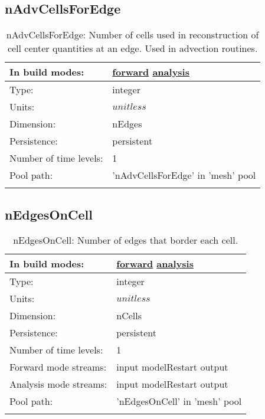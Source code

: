 \subsection[nAdvCellsForEdge]{nAdvCellsForEdge}
\label{subsec:var_sec_mesh_nAdvCellsForEdge}
\begin{center}
\begin{longtable}{| p{2.0in} | p{4.0in} |}
        \hline 
        In build modes: & \hyperref[subsec:forward_var_tab_mesh]{forward} \hyperref[subsec:analysis_var_tab_mesh]{analysis} \\
        \hline 
        Type: & integer \\
        \hline 
        Units: & $unitless$ \\
        \hline 
        Dimension: & nEdges \\
        \hline 
        Persistence: & persistent \\
        \hline 
        Number of time levels: & 1 \\
        \hline 
            Pool path: & 'nAdvCellsForEdge' in 'mesh' pool
 \\
		 \hline 
    \caption{nAdvCellsForEdge: Number of cells used in reconstruction of cell center quantities at an edge. Used in advection routines.}
\end{longtable}
\end{center}
\subsection[nEdgesOnCell]{nEdgesOnCell}
\label{subsec:var_sec_mesh_nEdgesOnCell}
\begin{center}
\begin{longtable}{| p{2.0in} | p{4.0in} |}
        \hline 
        In build modes: & \hyperref[subsec:forward_var_tab_mesh]{forward} \hyperref[subsec:analysis_var_tab_mesh]{analysis} \\
        \hline 
        Type: & integer \\
        \hline 
        Units: & $unitless$ \\
        \hline 
        Dimension: & nCells \\
        \hline 
        Persistence: & persistent \\
        \hline 
        Number of time levels: & 1 \\
        \hline 
		 Forward mode streams: &  input modelRestart output \\
        \hline 
		 Analysis mode streams: &  input modelRestart output \\
        \hline 
            Pool path: & 'nEdgesOnCell' in 'mesh' pool
 \\
		 \hline 
    \caption{nEdgesOnCell: Number of edges that border each cell.}
\end{longtable}
\end{center}
